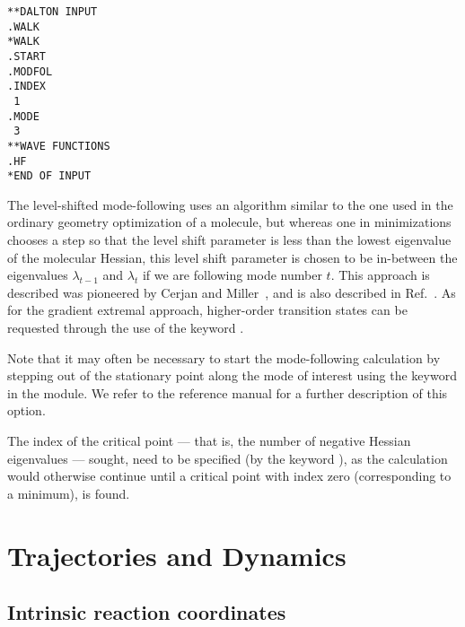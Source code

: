 \begin{verbatim}
**DALTON INPUT
.WALK
*WALK
.START
.MODFOL
.INDEX
 1
.MODE
 3
**WAVE FUNCTIONS
.HF
*END OF INPUT
\end{verbatim}

The level-shifted mode-following uses an algorithm similar to the
one used in the ordinary geometry optimization of a molecule, but
whereas one in minimizations chooses a step so that the level
shift parameter is less than the lowest eigenvalue of the
molecular Hessian, this level shift parameter is
chosen to be in-between the eigenvalues $\lambda_{t-1}$ and
$\lambda_{t}$ if we are following mode number $t$. This approach
is described was pioneered by Cerjan and
Miller~\cite{cjcwhmjcp75}, and is also described in
Ref.~\cite{hjajpjthjcp85}. As for the gradient extremal approach,
higher-order transition states can be
requested through the use of the keyword .

Note that it may often be necessary to start the mode-following
calculation by stepping out of the stationary point along the
mode of interest using the keyword  in the
 module. We refer to the reference manual for a further
description of this option.

The index of the critical point  --- that is,
the number of negative Hessian eigenvalues
--- sought, need to
be specified (by the keyword ), as the calculation would
otherwise continue until a critical point with index zero
(corresponding to a minimum), is found.

\section{Trajectories and Dynamics}

\subsection{Intrinsic reaction coordinates}\label{sec:irc}

\begin{center}
\end{center}


